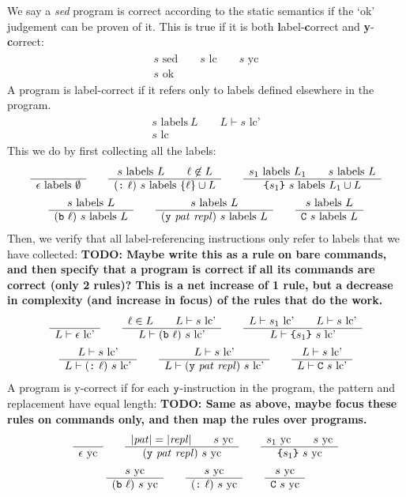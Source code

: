 \documentclass[11pt]{article}
\newcommand\RULE[2]{\begin{array}{c} #1 \\ \hline #2 \end{array}}
\newcommand\SED{\emph{sed}}
\newcommand\J[1]{\ensuremath{\text{ #1}}}
\newcommand\cmd[1]{\ensuremath{\text{\texttt{#1}}}}
\renewcommand\arg[1]{\ensuremath{\mathit{#1}}}
\begin{document}
We say a \SED{} program is correct according to the static semantics if the `ok' judgement can be proven of it.
This is true if it is both \textbf{l}abel-\textbf{c}orrect and \textbf{y}-\textbf{c}orrect:
\begin{gather*}
	\RULE{s \J{sed} \qquad s \J{lc} \qquad s \J{yc}}{s \J{ok}}
\end{gather*}
A program is label-correct if it refers only to labels defined elsewhere in the program.
\begin{gather*}
	\RULE{s \J{labels}\ L \qquad L \vdash s \J{lc'}}{s \J{lc}}
\end{gather*}
This we do by first collecting all the labels:
\begin{gather*}
	\RULE{}{\epsilon \J{labels}\ \emptyset} \qquad
	\RULE{s \J{labels}\ L \qquad \ell \not\in L}{(\cmd{:}\ \ell)\ s \J{labels}\ \{\ell\} \cup L} \qquad
	\RULE{s_1 \J{labels}\ L_1 \qquad s \J{labels}\ L}{\cmd{\{} s_1 \cmd{\}}\ s \J{labels}\ L_1 \cup L} \\
%
	\RULE{s \J{labels}\ L}{(\cmd{b}\ \ell)\ s \J{labels}\ L} \qquad
	\RULE{s \J{labels}\ L}{(\cmd{y}\ \arg{pat}\ \arg{repl})\ s \J{labels}\ L} \qquad
	\RULE{s \J{labels}\ L}{\cmd{C}\ s \J{labels}\ L}
\end{gather*}
Then, we verify that all label-referencing instructions only refer to labels that we have collected:
\textbf{TODO: Maybe write this as a rule on bare commands, and then specify that a program is correct if all its commands are correct (only 2 rules)? This is a net increase of 1 rule, but a decrease in complexity (and increase in focus) of the rules that do the work.}
\begin{gather*}
	\RULE{}{L \vdash \epsilon \J{lc'}} \qquad
	\RULE{\ell \in L \qquad L \vdash s \J{lc'}}{L \vdash (\cmd{b}\ \ell)\ s \J{lc'}} \qquad
	\RULE{L \vdash s_1 \J{lc'} \qquad L \vdash s \J{lc'}}{L \vdash \cmd{\{} s_1 \cmd{\}}\ s \J{lc'}} \\
%
	\RULE{L \vdash s \J{lc'}}{L \vdash (\cmd{:}\ \ell)\ s \J{lc'}} \qquad
	\RULE{L \vdash s \J{lc'}}{L \vdash (\cmd{y}\ \arg{pat}\ \arg{repl})\ s \J{lc'}} \qquad
	\RULE{L \vdash s \J{lc'}}{L \vdash \cmd{C}\ s \J{lc'}}
\end{gather*}
A program is y-correct if for each \cmd{y}-instruction in the program, the pattern and replacement have equal length:
\textbf{TODO: Same as above, maybe focus these rules on commands only, and then map the rules over programs.}
\begin{gather*}
	\RULE{}{\epsilon \J{yc}} \qquad
	\RULE{|\arg{pat}| = |\arg{repl}| \qquad s \J{yc}}{(\cmd{y}\ \arg{pat}\ \arg{repl})\ s \J{yc}} \qquad
	\RULE{s_1 \J{yc} \qquad s \J{yc}}{\cmd{\{} s_1 \cmd{\}}\ s \J{yc}} \\
%
	\RULE{s \J{yc}}{(\cmd{b}\ \ell)\ s \J{yc}} \qquad
	\RULE{s \J{yc}}{(\cmd{:}\ \ell)\ s \J{yc}} \qquad
	\RULE{s \J{yc}}{\cmd{C}\ s \J{yc}}
\end{gather*}
\end{document}
